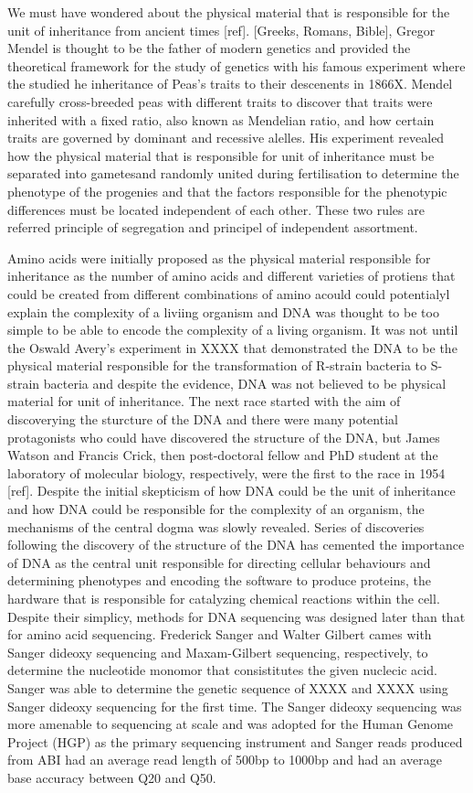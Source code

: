 We must have wondered about the physical material that is responsible for the unit of inheritance from ancient times [ref]. [Greeks, Romans, Bible], Gregor Mendel is thought to be the father of modern genetics and provided the theoretical framework for the study of genetics with his famous experiment where the studied he inheritance of Peas's traits to their descenents in 1866X.  Mendel carefully cross-breeded peas with different traits to discover that traits were inherited with a fixed ratio, also known as Mendelian ratio, and how certain traits are governed by dominant and recessive alelles. His experiment revealed how the physical material that is responsible for unit of inheritance must be separated into gametesand randomly united during fertilisation to determine the phenotype of the progenies and that the factors responsible for the phenotypic differences must be located independent of each other. These two rules are referred principle of segregation and principel of independent assortment.

Amino acids were initially proposed as the physical material responsible for inheritance as the number of amino acids and different varieties of protiens that could be created from different combinations of amino acould could potentialyl explain the complexity of a liviing organism and DNA was thought to be too simple to be able to encode the complexity of a living organism. It was not until the Oswald Avery's experiment in XXXX that demonstrated the DNA to be the physical material responsible for the transformation of R-strain bacteria to S-strain bacteria and despite the evidence, DNA was not believed to be physical material for unit of inheritance. The next race started with the aim of discoverying the sturcture of the DNA and there were many potential protagonists who could have discovered the structure of the DNA, but James Watson and Francis Crick, then post-doctoral fellow and PhD student at the laboratory of molecular biology, respectively, were the first to the race in 1954 [ref]. Despite the initial skepticism of how DNA could be the unit of inheritance and how DNA could be responsible for the complexity of an organism, the mechanisms of the central dogma was slowly revealed. Series of discoveries following the discovery of the structure of the DNA has cemented the importance of DNA as the central unit responsible for directing cellular behaviours and determining phenotypes and encoding the software to produce proteins, the hardware that is responsible for catalyzing chemical reactions within the cell. Despite their simplicy, methods for DNA sequencing was designed later than that for amino acid sequencing. Frederick Sanger and Walter Gilbert cames with Sanger dideoxy sequencing and Maxam-Gilbert sequencing, respectively, to determine the nucleotide monomor that consistitutes the given nuclecic acid. Sanger was able to determine the genetic sequence of XXXX and XXXX using Sanger dideoxy sequencing for the first time. The Sanger dideoxy sequencing was more amenable to sequencing at scale and was adopted for the Human Genome Project (HGP) as the primary sequencing instrument and Sanger reads produced from ABI had an average read length of 500bp to 1000bp and had an average base accuracy between Q20 and Q50. 

